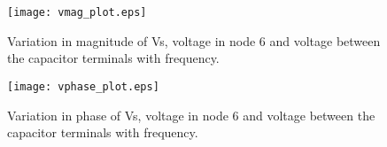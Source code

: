\begin{figure}[H] \centering
\texttt{[image: vmag\_plot.eps]}
\caption{Variation in magnitude of Vs, voltage in node 6 and voltage between the capacitor terminals with frequency.}
\label{fig:magnitude}
\end{figure}


\begin{figure}[H] \centering
\texttt{[image: vphase\_plot.eps]}
\caption{Variation in phase of Vs, voltage in node 6 and voltage between the capacitor terminals with frequency.}
\label{fig:phase}
\end{figure}





